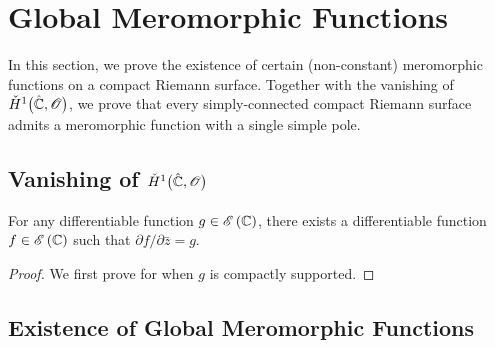 \documentclass[../Moduli_Spaces_of_Riemann_Surfaces.tex]{subfiles}
\begin{document}
    \section{Global Meromorphic Functions}
    In this section, we prove the existence of certain (non-constant) meromorphic functions on a compact Riemann surface. Together with the vanishing of $\check{H}^1\big(\hat{\mathbb{C}},\mathscr{O}\big)$, we prove that every simply-connected compact Riemann surface admits a meromorphic function with a single simple pole.
    \subsection{Vanishing of $\check{H}^1\big(\hat{\mathbb{C}},\mathscr{O}\big)$}
    \begin{lemma}[Dolbeault]
        For any differentiable function $g\in\mathscr{E}\left(\mathbb{C}\right)$, there exists a differentiable function $f\in\mathscr{E}\left(\mathbb{C}\right)$ such that $\partial f/\partial\bar{z}=g$.
    \end{lemma}
    \begin{proof}
        We first prove for when $g$ is compactly supported.
    \end{proof}
    \subsection{Existence of Global Meromorphic Functions}
\end{document}
